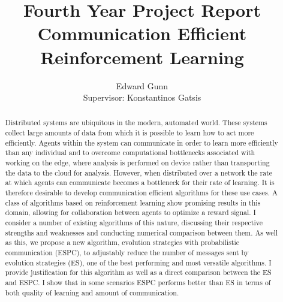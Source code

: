\documentclass[letterpaper,11pt]{report}
\begin{document}
\title{Fourth Year Project Report \\ \textbf{Communication Efficient Reinforcement Learning}}
\author{Edward Gunn \\ Supervisor: Konstantinos Gatsis}
\maketitle 

\begin{abstract}
    Distributed systems are ubiquitous in the modern, automated world.
    These systems collect large amounts of data from which it is possible to learn how to act more efficiently.
    Agents within the system can communicate in order to learn more efficiently than any individual and to overcome computational bottlenecks associated with working on the edge, where analysis is performed on device rather than transporting the data to the cloud for analysis.
    However, when distributed over a network the rate at which agents can communicate becomes a bottleneck for their rate of learning.
    It is therefore desirable to develop communication efficient algorithms for these use cases. A class of algorithms based on reinforcement learning show promising results in this domain, allowing for collaboration between agents to optimize a reward signal. I consider a number of existing algorithms of this nature, discussing their respective strengths and weaknesses and conducting numerical comparison between them. As well as this, we propose a new algorithm, evolution strategies with probabilistic communication (ESPC), to adjustably reduce the number of messages sent by evolution strategies (ES), one of the best performing and most versatile algorithms. I provide justification for this algorithm as well as a direct comparison between the ES and ESPC. I show that in some scenarios ESPC performs better than ES in terms of both quality of learning and amount of communication.
\end{abstract}

\tableofcontents











% 
\end{document}
